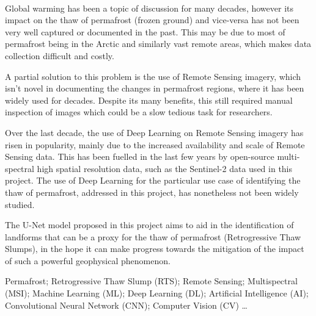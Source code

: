 \paragraph{}
Global warming has been a topic of discussion for many decades, however its impact on the thaw of permafrost (frozen ground) and vice-versa has not been very well captured or documented in the past. This may be due to most of permafrost being in the Arctic and similarly vast remote areas, which makes data collection difficult and costly.

A partial solution to this problem is the use of Remote Sensing imagery, which isn't novel in documenting the changes in permafrost regions, where it has been widely used for decades. Despite its many benefits, this still required manual inspection of images which could be a slow tedious task for researchers.

Over the last decade, the use of Deep Learning on Remote Sensing imagery has risen in popularity, mainly due to the increased availability and scale of Remote Sensing data. This has been fuelled in the last few years by open-source multi-spectral high spatial resolution data, such as the Sentinel-2 data used in this project.
The use of Deep Learning for the particular use case of identifying the thaw of permafrost, addressed in this project, has nonetheless not been widely studied.

The U-Net model proposed in this project aims to aid in the identification of landforms that can be a proxy for the thaw of permafrost (Retrogressive Thaw Slumps), in the hope it can make progress towards the mitigation of the impact of such a powerful geophysical phenomenon.


\begin{keywords}
Permafrost; Retrogressive Thaw Slump (RTS); Remote Sensing;  Multispectral  (MSI); Machine Learning (ML); Deep Learning (DL); Artificial Intelligence (AI); Convolutional Neural Network (CNN); Computer Vision (CV) \ldots
\end{keywords} 
